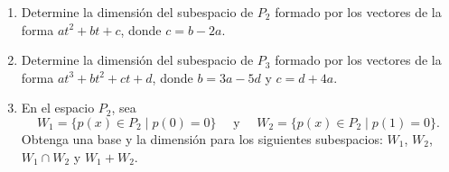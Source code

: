\begin{enumerate}[resume]
    \item Determine la dimensión del subespacio de $P_2$ formado por los vectores de la forma $at^2 + bt + c$, donde $c = b - 2a$.
    \item Determine la dimensión del subespacio de $P_3$ formado por los vectores de la forma $at^3 + bt^2 + ct + d$, donde $b = 3a - 5d$ y $c = d + 4a$.
    \item En el espacio $P_2$, sea
    $$W_1 = \{ p(x) \in P_2 \mid p(0) = 0 \} \quad \text{ y } \quad W_2 = \{ p(x) \in P_2 \mid p(1) = 0 \}.$$
    Obtenga una base y la dimensión para los siguientes subespacios: $W_1$, $W_2$, $W_1 \cap W_2$ y $W_1 + W_2$.
\end{enumerate}